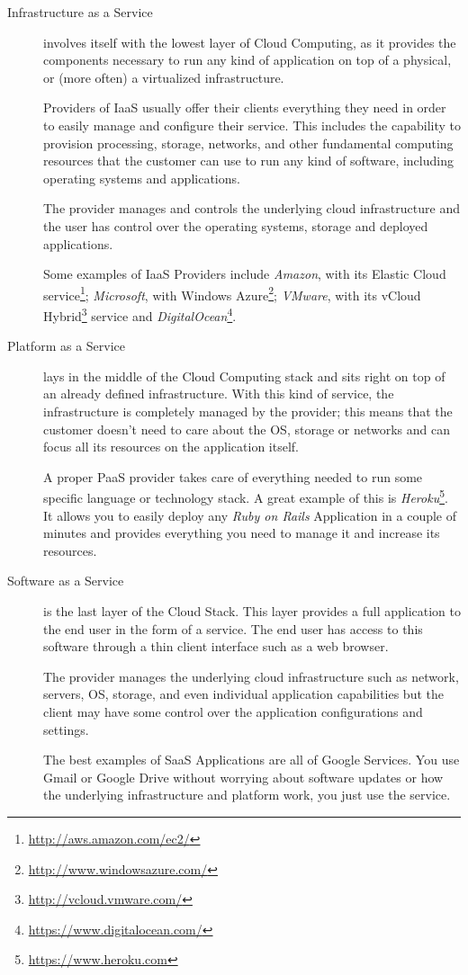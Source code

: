 \begin{description}
\item[Infrastructure as a Service] involves itself with the lowest layer of Cloud Computing, as it provides the components necessary to run any kind of application on top of a physical, or (more often) a virtualized infrastructure.

Providers of \ac{IaaS} usually offer their clients everything they need in order to easily manage and configure their service. This includes the capability to provision processing, storage, networks, and other fundamental computing resources that the customer can use to run any kind of software, including operating systems and applications. 

The provider manages and controls the underlying cloud infrastructure and the user has control over the operating systems, storage and deployed applications.
\cite[p. 8]{sabharwal:2013}

Some examples of \ac{IaaS} Providers include \textit{Amazon}, with its Elastic Cloud service\footnote{\url{http://aws.amazon.com/ec2/}}; \textit{ Microsoft}, with Windows Azure\footnote{\url{http://www.windowsazure.com/}}; \textit{VMware}, with its vCloud Hybrid\footnote{\url{http://vcloud.vmware.com/}} service and \textit{DigitalOcean}\footnote{\url{https://www.digitalocean.com/}}.
 
\item[Platform as a Service] lays in the middle of the Cloud Computing stack and sits right on top of an already defined infrastructure. With this kind of service, the infrastructure is completely managed by the provider; this means that the customer doesn't need to care about the \ac{OS}, storage or networks and can focus all its resources on the application itself.
\cite[p. 9]{mcgrath:2012}

A proper \ac{PaaS} provider takes care of everything needed to run some specific language or technology stack. A great example of this is \textit{Heroku}\footnote{\url{https://www.heroku.com}}. It allows you to easily deploy any \textit{Ruby on Rails} Application in a couple of minutes and provides everything you need to manage it and increase its resources.

\item[Software as a Service] is the last layer of the Cloud Stack. This layer provides a full application to the end user in the form of a service. The end user has access to this software through a thin client interface such as a web browser. 

The provider manages the underlying cloud infrastructure such as network, servers, \ac{OS}, storage, and even individual application capabilities but the client may have some control over the application configurations and settings.
\cite[p. 9]{sabharwal:2013}

The best examples of \ac{SaaS} Applications are all of Google Services. You use Gmail or Google Drive without worrying about software updates or how the underlying infrastructure and platform work, you just use the service.
\end{description}

